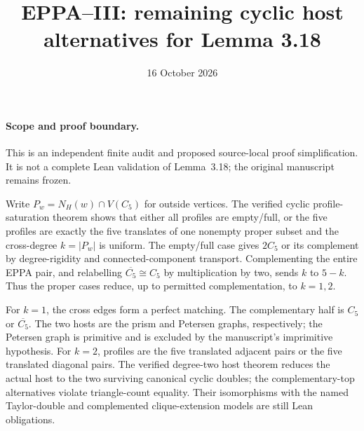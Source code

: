\documentclass[11pt,a4paper]{article}
\title{EPPA--III: remaining cyclic host alternatives for Lemma 3.18}
\date{16 October 2026}
\begin{document}
\maketitle

\paragraph{Scope and proof boundary.}
This is an independent finite audit and proposed
source-local proof simplification. It is not a complete
Lean validation of Lemma~3.18; the original manuscript
remains frozen.

Write \(P_w=N_H(w)\cap V(C_5)\) for outside vertices.
The verified cyclic profile-saturation theorem shows that
either all profiles are empty/full, or the five profiles
are exactly the five translates of one nonempty proper
subset and the cross-degree \(k=|P_w|\) is uniform.
The empty/full case gives \(2C_5\) or its complement
by degree-rigidity and connected-component transport.
Complementing the entire EPPA pair, and relabelling
\(\overline{C_5}\cong C_5\) by multiplication by two,
sends \(k\) to \(5-k\). Thus the proper cases reduce,
up to permitted complementation, to \(k=1,2\).

For \(k=1\), the cross edges form a perfect matching.
The complementary half is \(C_5\) or \(\overline{C_5}\).
The two hosts are the prism and Petersen graphs,
respectively; the Petersen graph is primitive and
is excluded by the manuscript's imprimitive hypothesis.
For \(k=2\), profiles are the five translated adjacent
pairs or the five translated diagonal pairs. The verified
degree-two host theorem reduces the actual host to
the two surviving canonical cyclic doubles; the
complementary-top alternatives violate triangle-count
equality. Their isomorphisms with the named Taylor-double
and complemented clique-extension models are still Lean
obligations.
\end{document}
